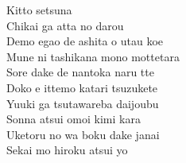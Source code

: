 \begin{multicols}{2}
Kitto setsuna\\
Chikai ga atta no darou\\
Demo egao de ashita o utau koe\\

Mune ni tashikana mono mottetara\\
Sore dake de nantoka naru tte\\
Doko e ittemo katari tsuzukete\\
Yuuki ga tsutawareba daijoubu\\
Sonna atsui omoi kimi kara\\
Uketoru no wa boku dake janai\\
Sekai mo hiroku atsui yo
\end{multicols}

\ifdefined\COMPLETE
\else
	
\fi
